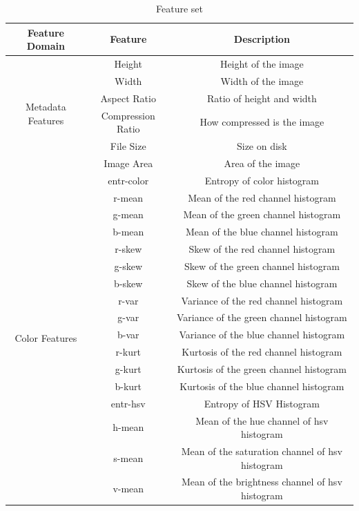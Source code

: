 \begin{table}[htb]
	\centering
	\caption{Feature set}
	\begin{tabular}{ |c|c|c| } 
		\hline
		Feature Domain & Feature & Description \\
		\hline
		\multirow{6}{4em}{Metadata Features} & Height & Height of the image \\
		&	Width & Width of the image \\ 
		&	Aspect Ratio & Ratio of height and width \\ 
		&   Compression Ratio & How compressed is the image \\ 
		&   File Size & Size on disk\\ 
		&   Image Area & Area of the image\\ 
		\hline
		\multirow{26}{4em}{Color Features} & entr-color & Entropy of color histogram\\
		&	r-mean & Mean of the red channel histogram\\ 
		&	g-mean & Mean of the green channel histogram\\ 
		&   b-mean & Mean of the blue channel histogram \\ 
	
		&	r-skew & Skew of the red channel histogram\\ 
		&	g-skew & Skew of the green channel histogram\\ 
		&   b-skew & Skew of the blue channel histogram \\ 
		
		&	r-var & Variance of the red channel histogram\\ 
		&	g-var & Variance of the green channel histogram\\ 
		&   b-var & Variance of the blue channel histogram \\ 
		
		&	r-kurt & Kurtosis of the red channel histogram\\ 
		&	g-kurt & Kurtosis of the green channel histogram\\ 
		&   b-kurt & Kurtosis of the blue channel histogram \\ 
		
		&   entr-hsv & Entropy of HSV Histogram \\
		&	h-mean & Mean of the hue channel of hsv histogram\\ 
		&	s-mean & Mean of the saturation channel of hsv histogram\\ 
		&   v-mean & Mean of the brightness channel of hsv histogram \\ 
	

\end{tabular}
\end{table}
